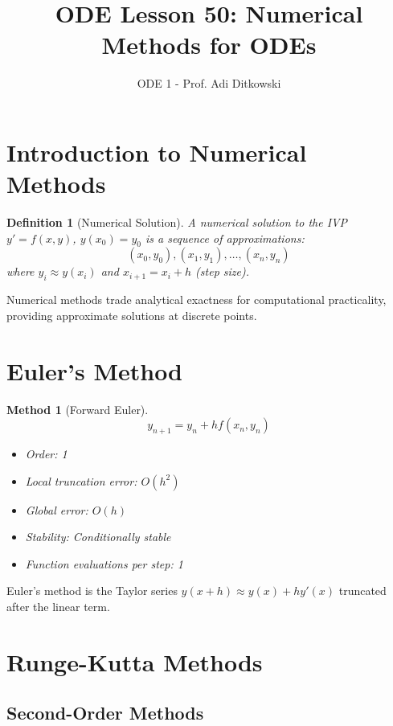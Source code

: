 \documentclass[12pt]{article}
\title{ODE Lesson 50: Numerical Methods for ODEs}
\author{ODE 1 - Prof. Adi Ditkowski}
\date{}
\newtheorem{definition}{Definition}
\newtheorem{method}{Method}
\begin{document}
\maketitle

\section{Introduction to Numerical Methods}

\begin{definition}[Numerical Solution]
A numerical solution to the IVP $y' = f(x,y)$, $y(x_{0}) = y_{0}$ is a sequence of approximations:
$$(x_{0}, y_{0}), (x_{1}, y_{1}), \ldots, (x_{n}, y_{n})$$
where $y_{i} \approx y(x_{i})$ and $x_{i+1} = x_{i} + h$ (step size).
\end{definition}

\begin{keypoint}
Numerical methods trade analytical exactness for computational practicality, providing approximate solutions at discrete points.
\end{keypoint}

\section{Euler's Method}

\begin{method}[Forward Euler]
$$y_{n+1} = y_{n} + hf(x_{n}, y_{n})$$
\begin{itemize}
\item Order: 1
\item Local truncation error: $O(h^{2})$
\item Global error: $O(h)$
\item Stability: Conditionally stable
\item Function evaluations per step: 1
\end{itemize}
\end{method}

\begin{insight}
Euler's method is the Taylor series $y(x+h) \approx y(x) + hy'(x)$ truncated after the linear term.
\end{insight}

\section{Runge-Kutta Methods}

\subsection{Second-Order Methods}
\end{document}
